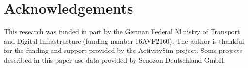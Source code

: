 \documentclass[3p,times,procedia]{elsarticle}
\begin{document}
%
%






\section{Acknowledgements}

This research was funded in part by the German Federal Ministry of Transport and Digital Infrastructure (funding number 16AVF2160). The author is thankful for the funding and support provided by the ActivitySim project. Some projects described in this paper use data provided by Senozon Deutschland GmbH.



\end{document}
